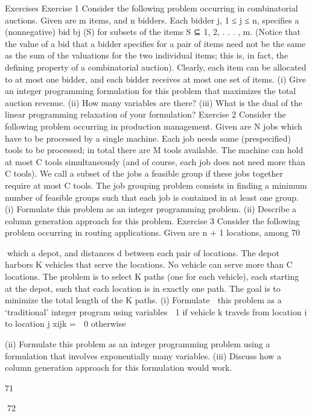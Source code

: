 Exercises
Exercise 1
Consider the following problem occurring in combinatorial auctions. Given are m items, and n bidders.
Each bidder j, 1 ≤ j ≤ n, specifies a (nonnegative) bid bj (S) for subsets of the items S ⊆ {1, 2, . . . , m}.
(Notice that the value of a bid that a bidder specifies for a pair of items need not be the same as the sum
of the valuations for the two individual items; this is, in fact, the defining property of a combinatorial
auction). Clearly, each item can be allocated to at most one bidder, and each bidder receives at most
one set of items.
(i) Give an integer programming formulation for this problem that maximizes the total auction revenue.
(ii) How many variables are there?
(iii) What is the dual of the linear programming relaxation of your formulation?
Exercise 2
Consider the following problem occurring in production management. Given are N jobs which have to be
processed by a single machine. Each job needs some (prespecified) tools to be processed; in total there
are M tools available. The machine can hold at most C tools simultaneously (and of course, each job
does not need more than C tools). We call a subset of the jobs a feasible group if these jobs together
require at most C tools. The job grouping problem consists in finding a minimum number of feasible
groups such that each job is contained in at least one group.
(i) Formulate this problem as an integer programming problem.
(ii) Describe a column generation approach for this problem.
Exercise 3
Consider the following problem occurring in routing applications. Given are n + 1 locations, among
70

which a depot, and distances d between each pair of locations. The depot harbors K vehicles that serve
the locations. No vehicle can serve more than C locations. The problem is to select K paths (one for
each vehicle), each starting at the depot, such that each location is in exactly one path. The goal is to
minimize the total length of the K paths.
(i) Formulate
 this problem as a ‘traditional' integer program using variables
 1 if vehicle k travels from location i to location j
xijk =
 0 otherwise

(ii) Formulate this problem as an integer programming problem using a formulation that involves
exponentially many variables.
(iii) Discuss how a column generation approach for this formulation would work.

71

72
